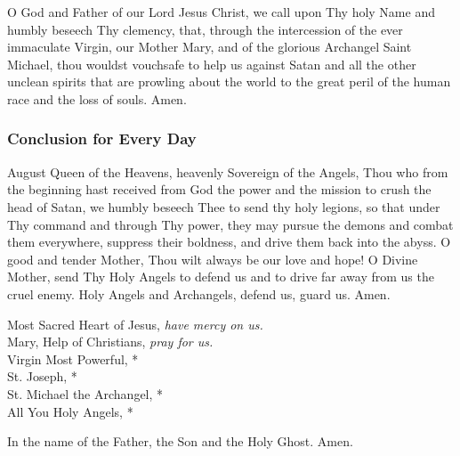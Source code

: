 \documentclass{article}
\begin{document}
\begin{multicols}{3}
O God and Father of our Lord Jesus Christ, we call upon Thy holy Name and
humbly beseech Thy clemency, that, through the intercession of the ever
immaculate Virgin, our Mother Mary, and of the glorious Archangel Saint Michael,
thou wouldst vouchsafe to help us against Satan and all the other unclean spirits that
are prowling about the world to the great peril of the human race and the loss of
souls. Amen.

\subsubsection*{Conclusion for Every Day}

August Queen of the Heavens, heavenly Sovereign of the Angels, Thou who from
the beginning hast received from God the power and the mission to crush the head
of Satan, we humbly beseech Thee to send thy holy legions, so that under Thy
command and through Thy power, they may pursue the demons and combat them
everywhere, suppress their boldness, and drive them back into the abyss. O good
and tender Mother, Thou wilt always be our love and hope! O Divine Mother, send
Thy Holy Angels to defend us and to drive far away from us the cruel enemy. Holy
Angels and Archangels, defend us, guard us. Amen.

Most Sacred Heart of Jesus, \textit{have mercy on us.}\\
Mary, Help of Christians, \textit{pray for us.}\\
Virgin Most Powerful, *\\
St. Joseph, *\\
St. Michael the Archangel, *\\
All You Holy Angels, *

In the name of the Father, the Son and the Holy Ghost. Amen.

\end{multicols}

\pagebreak
{}
\end{document}
